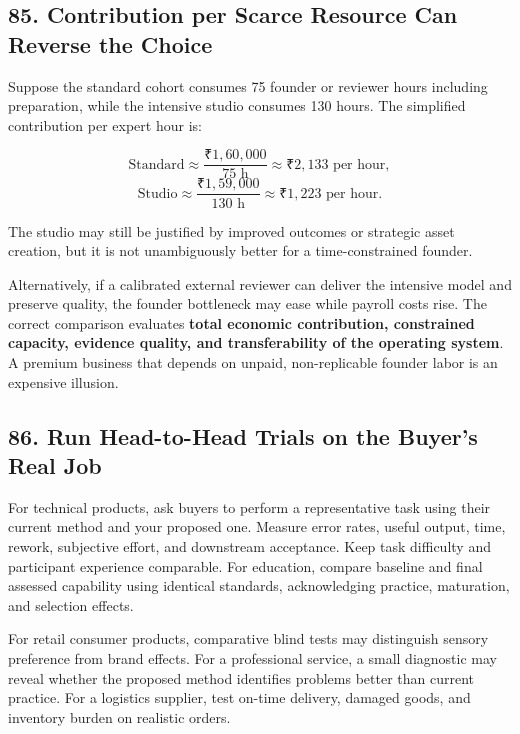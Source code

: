 \subsection*{85. Contribution per Scarce Resource Can Reverse the Choice}

Suppose the standard cohort consumes 75 founder or reviewer hours including preparation, while the intensive studio consumes 130 hours. The simplified contribution per expert hour is:

\begin{equation}
\text{Standard} \approx \frac{₹1,60,000}{75\text{ h}} \approx ₹2,133\text{ per hour},
\end{equation}
\begin{equation}
\text{Studio} \approx \frac{₹1,59,000}{130\text{ h}} \approx ₹1,223\text{ per hour}.
\end{equation}

The studio may still be justified by improved outcomes or strategic asset creation, but it is not unambiguously better for a time-constrained founder.

Alternatively, if a calibrated external reviewer can deliver the intensive model and preserve quality, the founder bottleneck may ease while payroll costs rise. The correct comparison evaluates \textbf{total economic contribution, constrained capacity, evidence quality, and transferability of the operating system}. A premium business that depends on unpaid, non-replicable founder labor is an expensive illusion.

\subsection*{86. Run Head-to-Head Trials on the Buyer's Real Job}

For technical products, ask buyers to perform a representative task using their current method and your proposed one. Measure error rates, useful output, time, rework, subjective effort, and downstream acceptance. Keep task difficulty and participant experience comparable. For education, compare baseline and final assessed capability using identical standards, acknowledging practice, maturation, and selection effects.

For retail consumer products, comparative blind tests may distinguish sensory preference from brand effects. For a professional service, a small diagnostic may reveal whether the proposed method identifies problems better than current practice. For a logistics supplier, test on-time delivery, damaged goods, and inventory burden on realistic orders.

